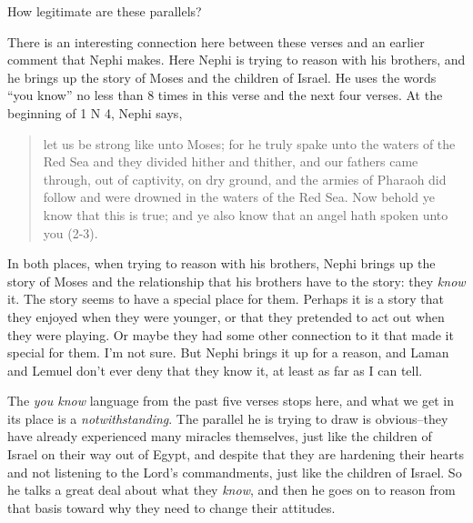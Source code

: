 \begin{compactdesc}
\begin{compactdesc}
		How legitimate are these parallels?
		\end{compactdesc}

		\item[25$\vert$]
		\begin{compactdesc}
		\item[ye know...] There is an interesting connection here between these verses and an earlier comment that Nephi makes. Here Nephi is trying to reason with his brothers, and he brings up the story of Moses and the children of Israel. He uses the words ``you know'' no less than 8 times in this verse and the next four verses. At the beginning of 1 N 4, Nephi says,

		\begin{quote}
		let us be strong like unto Moses; for he truly spake unto the waters of the Red Sea and they divided hither and thither, and our fathers came through, out of captivity, on dry ground, and the armies of Pharaoh did follow and were drowned in the waters of the Red Sea. Now behold ye know that this is true; and ye also know that an angel hath spoken unto you (2-3).
		\end{quote}

		In both places, when trying to reason with his brothers, Nephi brings up the story of Moses and the relationship that his brothers have to the story: they \textit{know} it. The story seems to have a special place for them. Perhaps it is a story that they enjoyed when they were younger, or that they pretended to act out when they were playing. Or maybe they had some other connection to it that made it special for them. I'm not sure. But Nephi brings it up for a reason, and Laman and Lemuel don't ever deny that they know it, at least as far as I can tell. 
		\end{compactdesc}

		\item[30$\vert$]
		\begin{compactdesc}
		\item[you know] The \textit{you know} language from the past five verses stops here, and what we get in its place is a \textit{notwithstanding}. The parallel he is trying to draw is obvious--they have already experienced many miracles themselves, just like the children of Israel on their way out of Egypt, and despite that they are hardening their hearts and not listening to the Lord's commandments, just like the children of Israel. So he talks a great deal about what they \textit{know}, and then he goes on to reason from that basis toward why they need to change their attitudes.
		\end{compactdesc}


\end{compactdesc}
